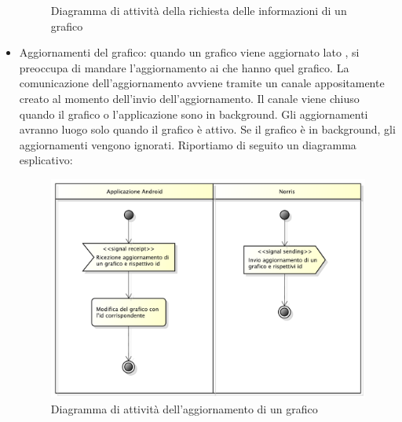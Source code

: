 \begin{itemize}
\begin{figure}[H]
        	\caption{Diagramma di attività della richiesta delle informazioni di un grafico}
    		\end{figure}
            \item Aggiornamenti del grafico: quando un grafico viene aggiornato lato ,  si preoccupa di mandare l'aggiornamento ai  che hanno quel grafico. La comunicazione dell'aggiornamento avviene tramite un canale  appositamente creato al momento dell'invio dell'aggiornamento. Il canale viene chiuso quando il grafico o l'applicazione sono in background. Gli aggiornamenti avranno luogo solo quando il grafico è attivo. Se il grafico è in background, gli aggiornamenti vengono ignorati. Riportiamo di seguito un diagramma esplicativo:
            \begin{figure}[H]\centering
        	\includegraphics[width=\textwidth]{SpecificaTecnica/Pics/Applicazione/AggiornamentiGrafico.pdf}
        	\caption{Diagramma di attività dell'aggiornamento di un grafico}
    		\end{figure}
        \end{itemize}

